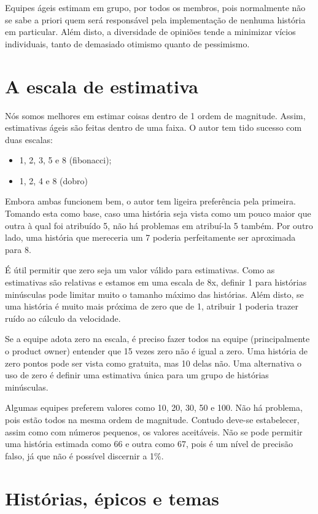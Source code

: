 \documentclass[a4paper,abntfigtabnum,noindentfirst]{abnt}
\begin{document}
Equipes ágeis estimam em grupo, por todos os membros, pois normalmente não se sabe a priori quem será responsável pela implementação de nenhuma história em particular. Além disto, a diversidade de opiniões tende a minimizar vícios individuais, tanto de demasiado otimismo quanto de pessimismo.


\section{A escala de estimativa}

Nós somos melhores em estimar coisas dentro de 1 ordem de magnitude. Assim, estimativas ágeis são feitas dentro de uma faixa. O autor tem tido sucesso com duas escalas:
\begin{itemize}
\item 1, 2, 3, 5 e 8 (fibonacci);
\item 1, 2, 4 e 8 (dobro)
\end{itemize}

Embora ambas funcionem bem, o autor tem ligeira preferência pela primeira. Tomando esta como base, caso uma história seja vista como um pouco maior que outra à qual foi atribuído 5, não há problemas em atribuí-la 5 também. Por outro lado, uma história que mereceria um 7 poderia perfeitamente ser aproximada para 8.

É útil permitir que zero seja um valor válido para estimativas. Como as estimativas são relativas e estamos em uma escala de 8x, definir 1 para histórias minúsculas pode limitar muito o tamanho máximo das histórias. Além disto, se uma história é muito mais próxima de zero que de 1, atribuir 1 poderia trazer ruído ao cálculo da velocidade.

Se a equipe adota zero na escala, é preciso fazer todos na equipe (principalmente o product owner) entender que 15 vezes zero não é igual a zero. Uma história de zero pontos pode ser vista como gratuita, mas 10 delas não. Uma alternativa o uso de zero é definir uma estimativa única para um grupo de histórias minúsculas.

Algumas equipes preferem valores como 10, 20, 30, 50 e 100. Não há problema, pois estão todos na mesma ordem de magnitude. Contudo deve-se estabelecer, assim como com números pequenos, os valores aceitáveis. Não se pode permitir uma história estimada como 66 e outra como 67, pois é um nível de precisão falso, já que não é possível discernir a 1\%.


\section{Histórias, épicos e temas}
\end{document}
